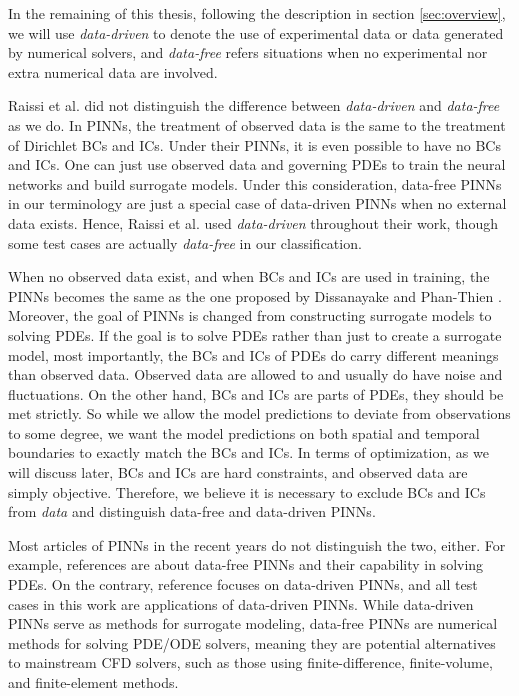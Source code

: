 In the remaining of this thesis, following the description in section \ref{sec:overview}, we will use {\it data-driven} to denote the use of experimental data or data generated by numerical solvers, and {\it data-free} refers situations when no experimental nor extra numerical data are involved. 

Raissi et al. did not distinguish the difference between {\it data-driven} and {\it data-free} as we do.
In PINNs, the treatment of observed data is the same to the treatment of Dirichlet BCs and ICs.
Under their PINNs, it is even possible to have no BCs and ICs.
One can just use observed data and governing PDEs to train the neural networks and build surrogate models.
Under this consideration, data-free PINNs in our terminology are just a special case of data-driven PINNs when no external data exists.
Hence, Raissi et al. used {\it data-driven} throughout their work, though some test cases are actually {\it data-free} in our classification.

When no observed data exist, and when BCs and ICs are used in training, the PINNs becomes the same as the one proposed by Dissanayake and Phan-Thien \cite{dissanayake_neural-network-based_1994}.
Moreover, the goal of PINNs is changed from constructing surrogate models to solving PDEs.
If the goal is to solve PDEs rather than just to create a surrogate model, most importantly, the BCs and ICs of PDEs do carry different meanings than observed data.
Observed data are allowed to and usually do have noise and fluctuations.
On the other hand, BCs and ICs are parts of PDEs, they should be met strictly.
So while we allow the model predictions to deviate from observations to some degree, we want the model predictions on both spatial and temporal boundaries to exactly match the BCs and ICs.
In terms of optimization, as we will discuss later, BCs and ICs are hard constraints, and observed data are simply objective.
Therefore, we believe it is necessary to exclude BCs and ICs from {\it data} and distinguish data-free and data-driven PINNs.

Most articles of PINNs in the recent years do not distinguish the two, either.
For example, references \cite{wang_understanding_2021,krishnapriyan_characterizing_2021,wang_when_2022} are about data-free PINNs and their capability in solving PDEs.
On the contrary, reference \cite{cai_physics-informed_2021} focuses on data-driven PINNs, and all test cases in this work are applications of data-driven PINNs.
While data-driven PINNs serve as methods for surrogate modeling, data-free PINNs are numerical methods for solving PDE/ODE solvers, meaning they are potential alternatives to mainstream CFD solvers, such as those using finite-difference, finite-volume, and finite-element methods.

